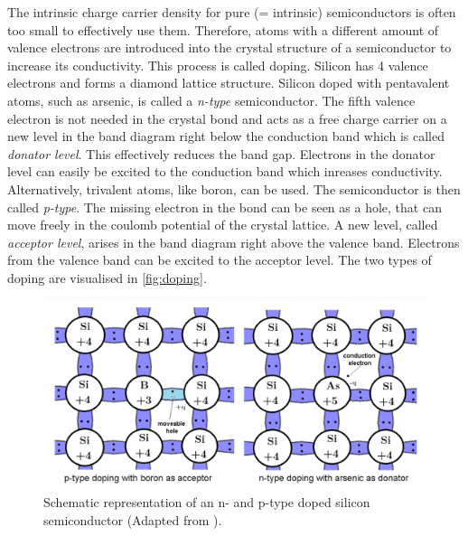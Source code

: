 The intrinsic charge carrier density for pure (= intrinsic) semiconductors is often too small to effectively use them. Therefore, atoms with a different amount of 
valence electrons are introduced
into the crystal structure of a semiconductor to increase its conductivity. This process is called doping. Silicon has 4 valence electrons and forms a diamond lattice structure. 
Silicon doped with pentavalent atoms, such as arsenic, is called a \textit{n-type} semiconductor. The fifth valence electron is not needed in the crystal bond and acts as a free 
charge carrier on a new level in the band diagram right below the conduction band which is called \textit{donator level}. This effectively reduces the band gap. 
Electrons in the donator level can easily be excited to the conduction band which inreases conductivity. \\
Alternatively, trivalent atoms, like boron, can be used. The semiconductor is then called \textit{p-type}. The missing electron in the bond can be seen as a hole, that can
move freely in the coulomb potential of the crystal lattice. A new level, called \textit{acceptor level}, arises in the band diagram right above the valence band.
Electrons from the valence band can be excited to the acceptor level.
The two types of doping are visualised in \autoref{fig:doping}.
\begin{figure}
    \centering 
    \includegraphics[width = .75\textwidth]{content/pics/doping.png}
    \caption{Schematic representation of an n- and p-type doped silicon semiconductor (Adapted from \cite{SiliconStrip}).}
    \label{fig:doping}
\end{figure}

